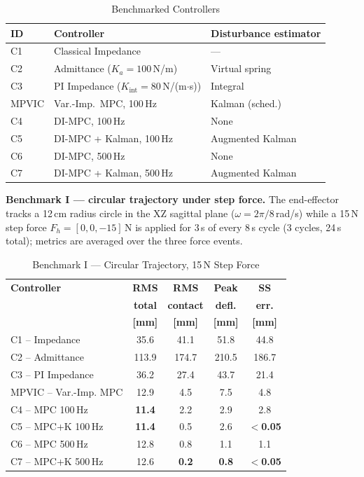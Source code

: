\documentclass[journal]{IEEEtran}
\begin{document}
\begin{table}[!t]
\caption{Benchmarked Controllers}
\label{tab:controllers}
\renewcommand{\arraystretch}{1.0}
\footnotesize
\begin{tabular}{lll}
\toprule
\textbf{ID} & \textbf{Controller} & \textbf{Disturbance estimator}\\
\midrule
C1 & Classical Impedance   & ---\\
C2 & Admittance ($K_a=100$\,N/m) & Virtual spring\\
C3 & PI Impedance ($K_{\text{int}}=80$\,N/(m$\cdot$s)) & Integral\\
MPVIC & Var.-Imp.\ MPC, 100\,Hz & Kalman (sched.)\\
C4 & DI-MPC, 100\,Hz    & None\\
C5 & DI-MPC + Kalman, 100\,Hz & Augmented Kalman\\
C6 & DI-MPC, 500\,Hz    & None\\
C7 & DI-MPC + Kalman, 500\,Hz & Augmented Kalman\\
\bottomrule
\end{tabular}
\end{table}

\textbf{Benchmark I --- circular trajectory under step force.}
The end-effector tracks a 12\,cm radius circle in the XZ sagittal plane
($\omega=2\pi/8$\,rad/s) while a 15\,N step force $F_h=[0,0,-15]$\,N is
applied for 3\,s of every 8\,s cycle (3 cycles, 24\,s total); metrics
are averaged over the three force events.

\begin{table}[!t]
\caption{Benchmark I --- Circular Trajectory, 15\,N Step Force}
\label{tab:bm1}
\renewcommand{\arraystretch}{1.0}
\footnotesize
\begin{tabular}{lcccc}
\toprule
\textbf{Controller} & \textbf{RMS} & \textbf{RMS} & \textbf{Peak} & \textbf{SS}\\
 & \textbf{total} & \textbf{contact} & \textbf{defl.} & \textbf{err.}\\
 & \textbf{[mm]} & \textbf{[mm]} & \textbf{[mm]} & \textbf{[mm]}\\
\midrule
C1 -- Impedance     & 35.6 & 41.1 & 51.8 & 44.8\\
C2 -- Admittance    & 113.9 & 174.7 & 210.5 & 186.7\\
C3 -- PI Impedance  & 36.2 & 27.4 & 43.7 & 21.4\\
MPVIC -- Var.-Imp. MPC & 12.9 & 4.5 & 7.5 & 4.8\\
C4 -- MPC 100\,Hz   & \textbf{11.4} & 2.2 & 2.9 & 2.8\\
C5 -- MPC+K 100\,Hz & \textbf{11.4} & 0.5 & 2.6 & \textbf{$<$0.05}\\
C6 -- MPC 500\,Hz   & 12.8 & 0.8 & 1.1 & 1.1\\
C7 -- MPC+K 500\,Hz & 12.6 & \textbf{0.2} & \textbf{0.8} & \textbf{$<$0.05}\\
\bottomrule
\end{tabular}
\end{table}
\end{document}
